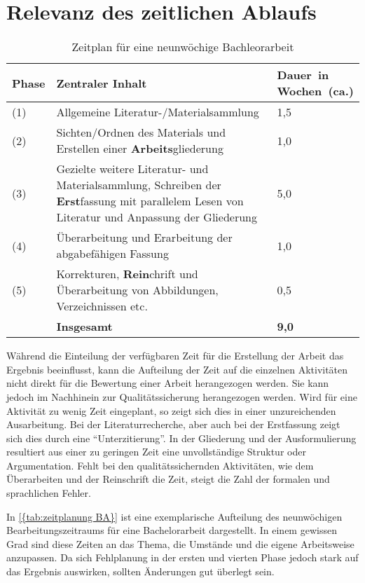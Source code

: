 \section{Relevanz des zeitlichen Ablaufs}
\begin{table}[H]
    \centering
    \begin{tabular}{p{1.5cm} p{9.5cm} p{2.7cm}}
        \textbf{Phase} & \textbf{Zentraler Inhalt} & \parbox[c]{2.7cm}{\textbf{Dauer~in \\ Wochen~(ca.)}} \\ \hline
        (1) & Allgemeine Literatur-/Materialsammlung & 1,5 \\
        (2) & Sichten/Ordnen des Materials und Erstellen einer \textbf{Arbeits}gliederung & 1,0 \\
        (3) & Gezielte weitere Literatur- und Materialsammlung, Schreiben der \textbf{Erst}fassung mit parallelem Lesen von Literatur und Anpassung der Gliederung  & 5,0 \\
        (4) & Überarbeitung und Erarbeitung der abgabefähigen Fassung & 1,0 \\
        (5) & Korrekturen, \textbf{Rein}chrift und Überarbeitung von Abbildungen, Verzeichnissen etc. & 0,5 \\
         & \textbf{Insgesamt} & \textbf{9,0}
    \end{tabular}
    \caption[Zeitplan für eine neunwöchige Bachleorarbeit]{Zeitplan für eine neunwöchige Bachleorarbeit\protect\cite[entnommen aus][]{Baensch:2013}}\label{{tab:zeitplanung BA}}
\end{table}
Während die Einteilung der verfügbaren Zeit für die Erstellung der Arbeit das Ergebnis beeinflusst, kann die Aufteilung der Zeit auf die einzelnen Aktivitäten nicht direkt für die Bewertung einer Arbeit herangezogen werden. Sie kann jedoch im Nachhinein zur Qualitätssicherung herangezogen werden. Wird für eine Aktivität zu wenig Zeit eingeplant, so zeigt sich dies in einer unzureichenden Ausarbeitung. Bei der Literaturrecherche, aber auch bei der Erstfassung zeigt sich dies durch eine \enquote{Unterzitierung}. In der Gliederung und der Ausformulierung resultiert aus einer zu geringen Zeit eine unvollständige Struktur oder Argumentation. Fehlt bei den qualitätssichernden Aktivitäten, wie dem Überarbeiten und der Reinschrift die Zeit, steigt die Zahl der formalen und sprachlichen Fehler. 

In \autoref{{tab:zeitplanung BA}} ist eine exemplarische Aufteilung des neunwöchigen Bearbeitungszeitraums für eine Bachelorarbeit dargestellt. In einem gewissen Grad sind diese Zeiten an das Thema, die Umstände und die eigene Arbeitsweise anzupassen. Da sich Fehlplanung in der ersten und vierten Phase jedoch stark auf das Ergebnis auswirken, sollten Änderungen gut überlegt sein.\cite[Vgl.][S. 49 f.]{Baensch:2013}

